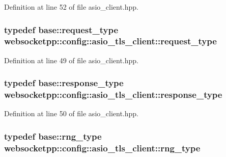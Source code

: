 Definition at line 52 of file asio\+\_\+client.\+hpp.

\hypertarget{structwebsocketpp_1_1config_1_1asio__tls__client_a43e2f23d37d5e3e5c6bc8d0b54f6c578}{}
\subsubsection[{request\+\_\+type}]{\setlength{\rightskip}{0pt plus 5cm}typedef {\bf base\+::request\+\_\+type} {\bf websocketpp\+::config\+::asio\+\_\+tls\+\_\+client\+::request\+\_\+type}}\label{structwebsocketpp_1_1config_1_1asio__tls__client_a43e2f23d37d5e3e5c6bc8d0b54f6c578}


Definition at line 49 of file asio\+\_\+client.\+hpp.

\hypertarget{structwebsocketpp_1_1config_1_1asio__tls__client_a8023cbcdddfd409027a88bbb1c5b6175}{}
\subsubsection[{response\+\_\+type}]{\setlength{\rightskip}{0pt plus 5cm}typedef {\bf base\+::response\+\_\+type} {\bf websocketpp\+::config\+::asio\+\_\+tls\+\_\+client\+::response\+\_\+type}}\label{structwebsocketpp_1_1config_1_1asio__tls__client_a8023cbcdddfd409027a88bbb1c5b6175}


Definition at line 50 of file asio\+\_\+client.\+hpp.

\hypertarget{structwebsocketpp_1_1config_1_1asio__tls__client_ac546cdbb58db76187d9fac5426eba65e}{}
\subsubsection[{rng\+\_\+type}]{\setlength{\rightskip}{0pt plus 5cm}typedef {\bf base\+::rng\+\_\+type} {\bf websocketpp\+::config\+::asio\+\_\+tls\+\_\+client\+::rng\+\_\+type}}\label{structwebsocketpp_1_1config_1_1asio__tls__client_ac546cdbb58db76187d9fac5426eba65e}


